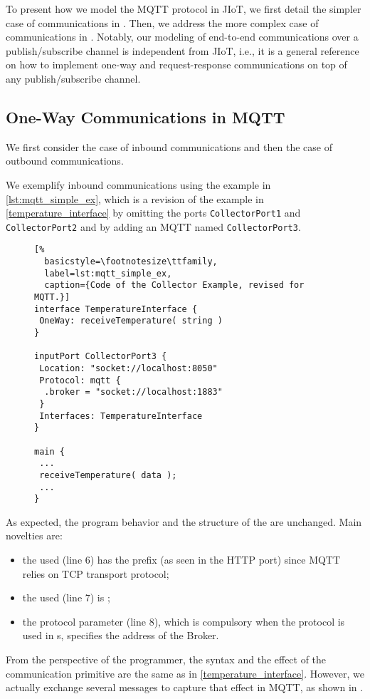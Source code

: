 To present how we model the MQTT protocol in JIoT, we first detail the simpler
case of  communications in . Then, we
address the more complex case of  communications in
. Notably, our modeling of end-to-end communications over
a publish/subscribe channel is independent from JIoT, i.e., it is a general
reference on how to implement one-way and request-response communications on
top of any publish/subscribe channel.

\subsection{One-Way Communications in MQTT}
\label{sub:ow_in_mqtt}

We first consider the case of inbound communications and then the case of
outbound communications.

We exemplify  inbound communications using the example in
\cref{lst:mqtt_simple_ex}, which is a revision of the example in
\cref{temperature_interface} by omitting the ports 
\texttt{CollectorPort1} and \texttt{CollectorPort2} and 
by adding an MQTT  named \texttt{CollectorPort3}.

\begin{figure}[t]
\begin{lstlisting}[%
  basicstyle=\footnotesize\ttfamily,
  label=lst:mqtt_simple_ex, 
  caption={Code of the Collector Example, revised for MQTT.}]
interface TemperatureInterface {
 OneWay: receiveTemperature( string )
}

inputPort CollectorPort3 {
 Location: "socket://localhost:8050"
 Protocol: mqtt {
  .broker = "socket://localhost:1883"
 }
 Interfaces: TemperatureInterface
}

main {
 ...
 receiveTemperature( data );
 ...
}
\end{lstlisting}
\end{figure}

As expected, the program behavior and the structure of the 
are unchanged. Main novelties are:
%
\begin{itemize}
  \item the used  (line 6) has the prefix 
   (as seen in the HTTP port) since MQTT relies on TCP
  transport protocol;
  \item the used  (line 7) is ;
  \item the  protocol parameter (line 8), which is
  compulsory when the  protocol is used in s,
  specifies the address of the Broker.
\end{itemize}
%
From the perspective of the programmer, the syntax and the effect of the
communication primitive are the same as in \cref{temperature_interface}.
However, we actually exchange several messages to capture that effect in MQTT,
as shown in .

